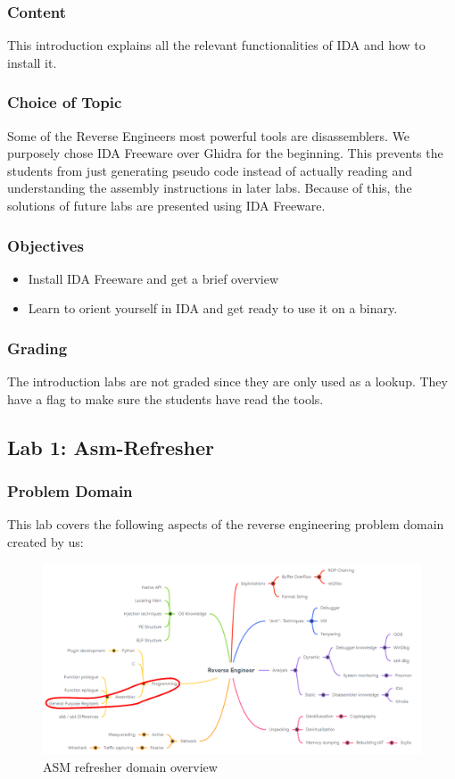 \subsubsection*{Content}
This introduction explains all the relevant functionalities of IDA and how to install it.
\subsubsection*{Choice of Topic}
Some of the Reverse Engineers most powerful tools are disassemblers. We purposely chose IDA Freeware over Ghidra for the beginning. This prevents the students from just generating pseudo code instead of actually reading and understanding the assembly instructions in later labs. Because of this, the solutions of future labs are presented using IDA Freeware.
\subsubsection*{Objectives}
\begin{itemize}
    \item Install IDA Freeware and get a brief overview
    \item Learn to orient yourself in IDA and get ready to use it on a binary.
\end{itemize}
\subsubsection*{Grading}
The introduction labs are not graded since they are only used as a lookup. They have a flag to make sure the students have read the tools.
\pagebreak

\subsection{Lab 1: Asm-Refresher}
\subsubsection*{Problem Domain}
This lab covers the following aspects of the reverse engineering problem domain created by us:
\vspace{-2ex}
\begin{figure}[H]
    \includegraphics[width=\textwidth]{resources/ASM-overview-light.png}
    \caption{ASM refresher domain overview}
    \label{fig:refresher-overview}
\end{figure}
